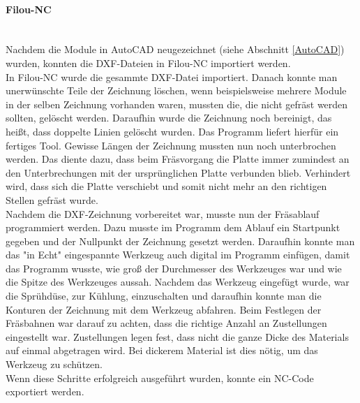    \paragraph{Filou-NC}\mbox{}\\
    Nachdem die Module in AutoCAD neugezeichnet (siehe Abschnitt \ref{AutoCAD}) wurden, konnten die DXF-Dateien in Filou-NC importiert werden.\\
    In Filou-NC wurde die gesammte DXF-Datei importiert. Danach konnte man unerwünschte Teile der Zeichnung löschen, wenn beispielsweise mehrere Module in der selben Zeichnung vorhanden waren, mussten die, die nicht gefräst werden sollten, gelöscht werden. Daraufhin wurde die Zeichnung noch bereinigt, das heißt, dass doppelte Linien gelöscht wurden. Das Programm liefert hierfür ein fertiges Tool. Gewisse Längen der Zeichnung mussten nun noch unterbrochen werden. Das diente dazu, dass beim Fräsvorgang die Platte immer zumindest an den Unterbrechungen mit der ursprünglichen Platte verbunden blieb. Verhindert wird, dass sich die Platte verschiebt und somit nicht mehr an den richtigen Stellen gefräst wurde.\\
    Nachdem die DXF-Zeichnung vorbereitet war, musste nun der Fräsablauf programmiert werden. Dazu musste im Programm dem Ablauf ein Startpunkt gegeben und der Nullpunkt der Zeichnung gesetzt werden. Daraufhin konnte man das "in Echt" eingespannte Werkzeug auch digital im Programm einfügen, damit das Programm wusste, wie groß der Durchmesser des Werkzeuges war und wie die Spitze des Werkzeuges aussah. Nachdem das Werkzeug eingefügt wurde, war die Sprühdüse, zur Kühlung, einzuschalten und daraufhin konnte man die Konturen der Zeichnung mit dem Werkzeug abfahren. Beim Festlegen der Fräsbahnen war darauf zu achten, dass die richtige Anzahl an Zustellungen eingestellt war. Zustellungen legen fest, dass nicht die ganze Dicke des Materials auf einmal abgetragen wird. Bei dickerem Material ist dies nötig, um das Werkzeug zu schützen.\\
    Wenn diese Schritte erfolgreich ausgeführt wurden, konnte ein NC-Code exportiert werden. 
